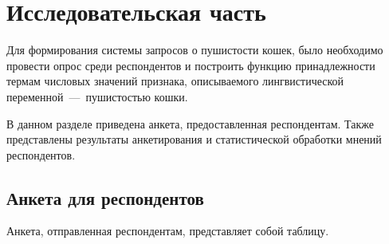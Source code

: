 \chapter{Исследовательская часть}
Для формирования системы запросов о пушистости кошек, было необходимо провести опрос среди респондентов и построить функцию принадлежности термам числовых значений признака, описываемого лингвистической переменной~---~пушистостью кошки.
 
В данном разделе приведена анкета, предоставленная респондентам. Также представлены результаты анкетирования и статистической обработки мнений респондентов.

\section{Анкета для респондентов}

Анкета, отправленная респондентам, представляет собой таблицу.

